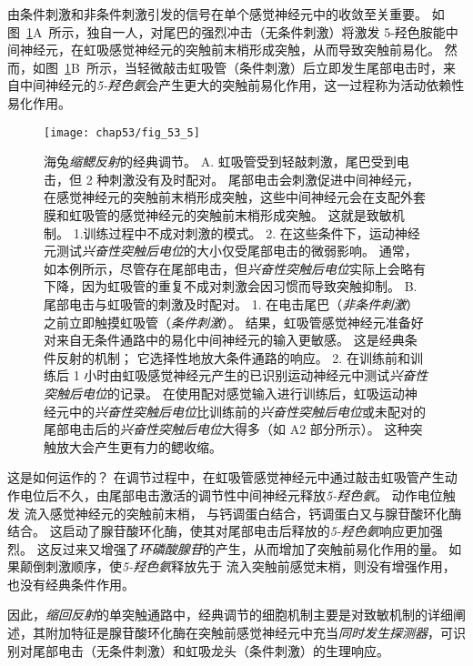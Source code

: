 由条件刺激和非条件刺激引发的信号在单个感觉神经元中的收敛至关重要。
如图~\ref{fig:53_5}A~所示，独自一人，对尾巴的强烈冲击（无条件刺激）将激发 5-羟色胺能中间神经元，在虹吸感觉神经元的突触前末梢形成突触，从而导致突触前易化。
然而，如图~\ref{fig:53_5}B~所示，当轻微敲击虹吸管（条件刺激）后立即发生尾部电击时，来自中间神经元的\textit{5-羟色氨}会产生更大的突触前易化作用，这一过程称为活动依赖性易化作用。


\begin{figure}[htbp]
	\centering
	\texttt{[image: chap53/fig\_53\_5]}
	\caption{海兔\textit{缩鳃反射}的经典调节\cite{hawkins1983cellular}。
		A. 虹吸管受到轻敲刺激，尾巴受到电击，但 2 种刺激没有及时配对。
		尾部电击会刺激促进中间神经元，在感觉神经元的突触前末梢形成突触，这些中间神经元会在支配外套膜和虹吸管的感觉神经元的突触前末梢形成突触。
		这就是致敏机制。
		1.训练过程中不成对刺激的模式。
		2. 在这些条件下，运动神经元测试\textit{兴奋性突触后电位}的大小仅受尾部电击的微弱影响。
		通常，如本例所示，尽管存在尾部电击，但\textit{兴奋性突触后电位}实际上会略有下降，因为虹吸管的重复不成对刺激会因习惯而导致突触抑制。
		B. 尾部电击与虹吸管的刺激及时配对。
		1. 在电击尾巴（\textit{非条件刺激}）之前立即触摸虹吸管（\textit{条件刺激}）。
		结果，虹吸管感觉神经元准备好对来自无条件通路中的易化中间神经元的输入更敏感。
		这是经典条件反射的机制；
		它选择性地放大条件通路的响应。
		2. 在训练前和训练后 1 小时由虹吸感觉神经元产生的已识别运动神经元中测试\textit{兴奋性突触后电位}的记录。
		在使用配对感觉输入进行训练后，虹吸运动神经元中的\textit{兴奋性突触后电位}比训练前的\textit{兴奋性突触后电位}或未配对的尾部电击后的\textit{兴奋性突触后电位}大得多（如 A2 部分所示）。
		这种突触放大会产生更有力的鳃收缩。}
	\label{fig:53_5}
\end{figure}


这是如何运作的？
在调节过程中，在虹吸管感觉神经元中通过敲击虹吸管产生动作电位后不久，由尾部电击激活的调节性中间神经元释放\textit{5-羟色氨}。
动作电位触发  流入感觉神经元的突触前末梢， 与钙调蛋白结合，钙调蛋白又与腺苷酸环化酶结合。
这启动了腺苷酸环化酶，使其对尾部电击后释放的\textit{5-羟色氨}响应更加强烈。
这反过来又增强了\textit{环磷酸腺苷}的产生，从而增加了突触前易化作用的量。
如果颠倒刺激顺序，使\textit{5-羟色氨}释放先于  流入突触前感觉末梢，则没有增强作用，也没有经典条件作用。


因此，\textit{缩回反射}的单突触通路中，经典调节的细胞机制主要是对致敏机制的详细阐述，其附加特征是腺苷酸环化酶在突触前感觉神经元中充当\textit{同时发生探测器}，可识别对尾部电击（无条件刺激）和虹吸龙头（条件刺激）的生理响应。


